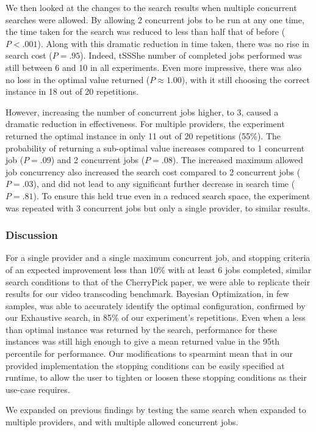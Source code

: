 \documentclass{report}
\begin{document}
We then looked at the changes to the search results when multiple concurrent searches were allowed. By allowing 2 concurrent jobs to be run at any one time, the time taken for the search was reduced to less than half that of before ($P < .001$). Along with this  dramatic reduction in time taken, there was no rise in search cost ($P = .95$). Indeed, tSSShe number of completed jobs performed was still between 6 and 10 in all experiments. Even more impressive, there was also no loss in the optimal value returned ($P \approx 1.00 $), with it still choosing the correct instance in 18 out of 20 repetitions.

However, increasing the number of concurrent jobs higher, to 3, caused a dramatic reduction in effectiveness. For multiple providers, the experiment returned the optimal instance in only 11 out of 20 repetitions (55\%). The probability of returning a sub-optimal value increases compared to 1 concurrent job ($ P = .09$) and 2 concurrent jobs ($P = .08$). The increased maximum allowed job concurrency also increased the search cost compared to 2 concurrent jobs ($P = .03$), and did not lead to any significant further decrease in search time ($P = .81$). To ensure this held true even in a reduced search space, the experiment was repeated with 3 concurrent jobs but only a single provider, to similar results.

\subsubsection{Discussion}
For a single provider and a single maximum concurrent job, and stopping criteria of an expected improvement less than 10\% with at least 6 jobs completed, similar search conditions to that of the CherryPick paper\cite{Alipourfard2017}, we were able to replicate their results for our video transcoding benchmark. Bayesian Optimization, in few samples, was able to accurately identify the optimal configuration, confirmed by our Exhaustive search, in 85\% of our experiment's repetitions. Even when a less than optimal instance was returned by the search, performance for these instances was still high enough to give a mean returned value in the 95th percentile for performance. Our modifications to spearmint mean that in our provided implementation the stopping conditions can be easily specified at runtime, to allow the user to tighten or loosen these stopping conditions as their use-case requires.

We expanded on previous findings by testing the same search when expanded to multiple providers, and with multiple allowed concurrent jobs.
\end{document}
